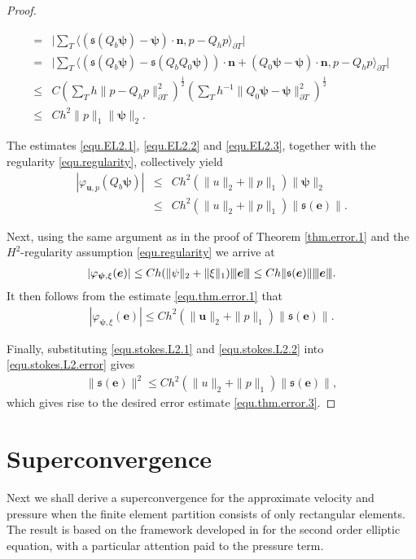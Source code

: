 \documentclass[final,leqno]{siamltex704}
\newcommand{\vertiii}[1]{{\left\vert\kern-0.25ex\left\vert\kern-0.25ex\left\vert #1
    \right\vert\kern-0.25ex\right\vert\kern-0.25ex\right\vert}}
\def\S{{\mathfrak s}}
\begin{document}
\begin{proof}
\begin{itemize}
\begin{equation}
\begin{split}
= & \bigg|\sum_{T} \langle (\S(Q_b \bm{\psi})- \bm{\psi})\cdot \bm{n},p - Q_h p\rangle_{\partial T}\bigg| \\
=&\bigg|\sum_{T} \langle (\S(Q_b \bm{\psi}) - \S(Q_bQ_0\bm{\psi}))\cdot\bm{n} + (Q_0 \bm{\psi}- \bm{\psi})\cdot \bm{n},p - Q_h p\rangle_{\partial T} \bigg| \\
\leq & C \left(\sum_{T} h\|p-Q_hp\|^2_{\partial T} \right)^{\frac{1}{2}}\left(\sum_{T} h^{-1}\|Q_0 \bm{\psi}- \bm{\psi}\|^2_{\partial T} \right)^{\frac{1}{2}}\\
\leq & Ch^2\|p\|_1 \|\bm{\psi}\|_2.
\end{split}
\end{equation}
\end{itemize}
The estimates \eqref{equ.EL2.1}, \eqref{equ.EL2.2} and \eqref{equ.EL2.3}, together with the regularity \eqref{equ.regularity}, collectively yield
\begin{eqnarray}\label{equ.stokes.L2.1}
|\varphi_{\bm{u},p}(Q_b \bm{\psi})|
&\leq& Ch^{2}(\|u\|_2+\|p\|_1)\|\bm{\psi}\|_2\\
&\leq& Ch^{2}(\|u\|_2+\|p\|_1)\|\S(\bm{e})\|.\nonumber
\end{eqnarray}

Next, using the same argument as in the proof of Theorem \ref{thm.error.1} and the $H^2$-regularity assumption \eqref{equ.regularity} we arrive at
\begin{eqnarray*}%
|\varphi_{\bm{\psi},\xi}(\bm{e})|\leq Ch(\|\psi\|_2 +\|\xi\|_1)\vertiii{\bm{e}}\leq Ch \|\S(\bm{e})\|\vertiii{\bm{e}}.
\end{eqnarray*}
It then follows from the estimate \eqref{equ.thm.error.1} that
\begin{eqnarray}\label{equ.stokes.L2.2}
|\varphi_{\bm{\psi},\xi}(\bm{e})|\leq Ch^2(\|\bm{u}\|_2 +\|p\|_1)\|\S(\bm{e})\|.
\end{eqnarray}

Finally, substituting \eqref{equ.stokes.L2.1} and \eqref{equ.stokes.L2.2} into \eqref{equ.stokes.L2.error} gives
\begin{eqnarray}
\|\S(\bm{e})\|^2\leq Ch^2(\|u\|_2+\|p\|_1)\|\S(\bm{e})\|,
\end{eqnarray}
which gives rise to the desired error estimate \eqref{equ.thm.error.3}.
\end{proof}

\section{Superconvergence}\label{sectionSuperC}
Next we shall derive a superconvergence for the approximate velocity and pressure when the finite element partition consists of only rectangular elements. The result is based on the framework developed in \cite{LiDanWW} for the second order elliptic equation, with a particular attention paid to the pressure term.
\end{document}
